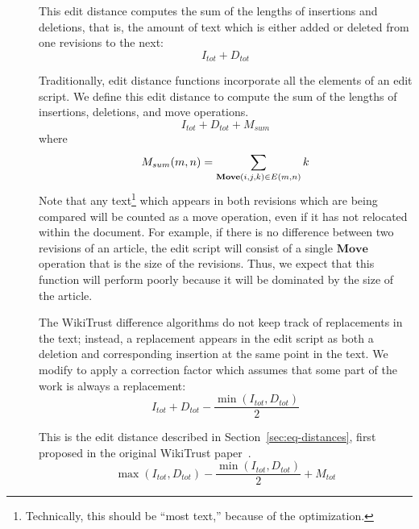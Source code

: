\begin{description}

\item[] This edit distance computes the sum of the lengths
    of insertions and deletions, that is, the amount of text which
    is either added or deleted from one revisions to the next:
    \begin{equation*}
    I_{tot} + D_{tot}
    \end{equation*}

\item[] Traditionally, edit distance functions incorporate
    all the elements of an edit script.  We define
    this edit distance to compute the sum of the lengths
    of insertions, deletions, and move operations.
    \begin{equation*}
    I_{tot} + D_{tot} + M_{sum}
    \end{equation*}
    where
    \begin{equation*}
    M_{sum}(m,n) = \sum_{\mathbf{Move}(i, j, k) \in E(m,n)} k \\
    \end{equation*}
    Note that any text\footnote{Technically, this should be ``most
    text,'' because of the  optimization.}
    which appears in both revisions which are being
    compared will be counted as a move operation, even if it has not
    relocated within the document.
    For example, if there is no difference between two revisions of
    an article, the edit script will consist of a single $\mathbf{Move}$
    operation that is the size of the revisions.
    Thus, we expect that this function will perform poorly because
    it will be dominated by the size of the article.

\item[]
    The WikiTrust difference algorithms do not keep track of replacements
    in the text; instead, a replacement appears in the edit script as
    both a deletion and corresponding insertion at the same point in the text.
    We modify  to apply a correction factor which
    assumes that some part of the work is always a replacement:
    \begin{equation*}
    I_{tot} + D_{tot} - \frac{\min(I_{tot}, D_{tot})}{2}
    \end{equation*}

\item[] This is the edit distance described in
    Section~\ref{sec:eq-distances}, first proposed in
    the original WikiTrust paper~\cite{Adler2007}.
    \begin{equation*}
    \max(I_{tot}, D_{tot}) - \frac{\min(I_{tot}, D_{tot})}{2}
		+ M_{tot}
    \end{equation*}


\end{description}
